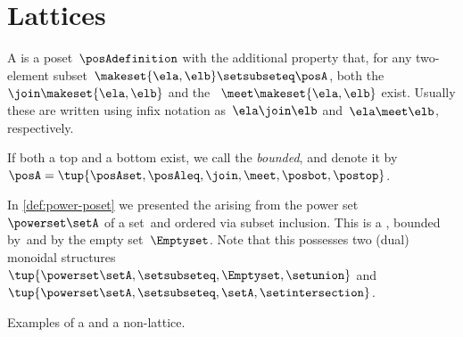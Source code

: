 
\section{Lattices}


\begin{definition}[Lattice]
    \label{def:lattice}
    A  is a poset~$\posAdefinition$ with the additional property that, for any two-element subset~$\makeset{\ela, \elb} \setsubseteq \posA$, both the ~$\join \makeset{\ela, \elb}$ and the ~$\meet \makeset{\ela, \elb }$ exist.
    Usually these are written using infix notation as~$\ela \join \elb$ and~$\ela \meet \elb$, respectively.
\end{definition}

\begin{marginfigure}
    \centering
    \caption{}
    \label{fig:lattice-wood}
\end{marginfigure}

\begin{definition}
    \label{def:bounded-lattice}
    If both a top and a bottom exist, we call the  \emph{bounded}, and denote it
    by~$\posA = \tup{\posAset,{{\posAleq}},{{\join}},{{\meet}},\posbot,\postop}$.
\end{definition}

\begin{example}
    In \cref{def:power-poset} we presented the  arising from the power set~$\powerset \setA$ of a set~\setA and ordered via subset inclusion.
    This is a , bounded by~\setA and by the empty set~$\Emptyset$.
    Note that this  possesses two (dual) monoidal structures~$\tup{\powerset \setA,{{\setsubseteq}},\Emptyset,{{\setunion}}}$ and~$\tup{\powerset \setA,{{\setsubseteq}},\setA,{{\setintersection}}}$.
\end{example}

\begin{marginfigure}
    \centering

    \caption{Examples of a  and a non-lattice. }
    \label{fig:exlattice}
\end{marginfigure}

